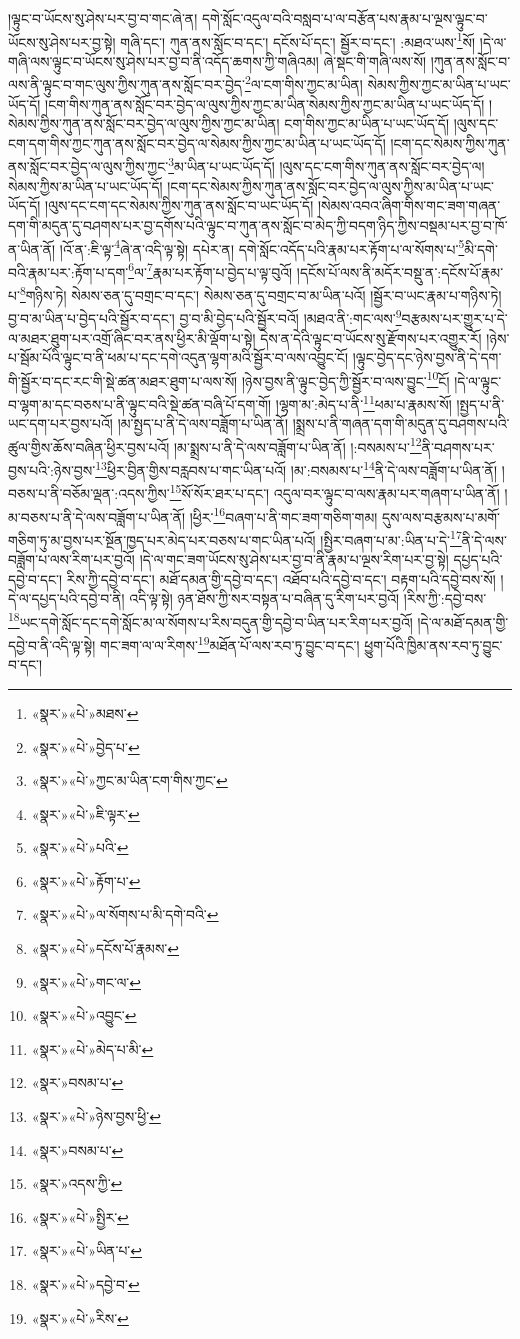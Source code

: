།ལྟུང་བ་ཡོངས་སུ་ཤེས་པར་བྱ་བ་གང་ཞེ་ན། དགེ་སློང་འདུལ་བའི་བསླབ་པ་ལ་བརྩོན་པས་རྣམ་པ་ལྔས་ལྟུང་བ་ཡོངས་སུ་ཤེས་པར་བྱ་སྟེ། གཞི་དང་། ཀུན་ནས་སློང་བ་དང་། དངོས་པོ་དང་། སྦྱོར་བ་དང་། :མཐའ་ཡས་\footnote{«སྣར་»«པེ་»མཐས་}སོ། །དེ་ལ་གཞི་ལས་ལྟུང་བ་ཡོངས་སུ་ཤེས་པར་བྱ་བ་ནི་འདོད་ཆགས་ཀྱི་གཞིའམ། ཞེ་སྡང་གི་གཞི་ལས་སོ། །ཀུན་ནས་སློང་བ་ལས་ནི་ལྟུང་བ་གང་ལུས་ཀྱིས་ཀུན་ནས་སློང་བར་བྱེད་\footnote{«སྣར་»«པེ་»བྱེད་པ་}ལ་ངག་གིས་ཀྱང་མ་ཡིན། སེམས་ཀྱིས་ཀྱང་མ་ཡིན་པ་ཡང་ཡོད་དོ། །ངག་གིས་ཀུན་ནས་སློང་བར་བྱེད་ལ་ལུས་ཀྱིས་ཀྱང་མ་ཡིན་སེམས་ཀྱིས་ཀྱང་མ་ཡིན་པ་ཡང་ཡོད་དོ། །སེམས་ཀྱིས་ཀུན་ནས་སློང་བར་བྱེད་ལ་ལུས་ཀྱིས་ཀྱང་མ་ཡིན། ངག་གིས་ཀྱང་མ་ཡིན་པ་ཡང་ཡོད་དོ། །ལུས་དང་ངག་དག་གིས་ཀྱང་ཀུན་ནས་སློང་བར་བྱེད་ལ་སེམས་ཀྱིས་ཀྱང་མ་ཡིན་པ་ཡང་ཡོད་དོ། །ངག་དང་སེམས་ཀྱིས་ཀུན་ནས་སློང་བར་བྱེད་ལ་ལུས་ཀྱིས་ཀྱང་\footnote{«སྣར་»«པེ་»ཀྱང་མ་ཡིན་ངག་གིས་ཀྱང་}མ་ཡིན་པ་ཡང་ཡོད་དོ། །ལུས་དང་ངག་གིས་ཀུན་ནས་སློང་བར་བྱེད་ལ། སེམས་ཀྱིས་མ་ཡིན་པ་ཡང་ཡོད་དོ། །ངག་དང་སེམས་ཀྱིས་ཀུན་ནས་སློང་བར་བྱེད་ལ་ལུས་ཀྱིས་མ་ཡིན་པ་ཡང་ཡོད་དོ། །ལུས་དང་ངག་དང་སེམས་ཀྱིས་ཀུན་ནས་སློང་བ་ཡང་ཡོད་དོ། །སེམས་འབའ་ཞིག་གིས་གང་ཟག་གཞན་དག་གི་མདུན་དུ་བཤགས་པར་བྱ་དགོས་པའི་ལྟུང་བ་ཀུན་ནས་སློང་བ་མེད་ཀྱི་བདག་ཉིད་ཀྱིས་བསྡམ་པར་བྱ་བ་ཁོ་ན་ཡིན་ནོ། །འོ་ན་:ཇི་ལྟ་\footnote{«སྣར་»«པེ་»ཇི་ལྟར་}ཞེ་ན་འདི་ལྟ་སྟེ། དཔེར་ན། དགེ་སློང་འདོད་པའི་རྣམ་པར་རྟོག་པ་ལ་སོགས་པ་\footnote{«སྣར་»«པེ་»པའི་}མི་དགེ་བའི་རྣམ་པར་:རྟོག་པ་དག་\footnote{«སྣར་»«པེ་»རྟོག་པ་}ལ་\footnote{«སྣར་»«པེ་»ལ་སོགས་པ་མི་དགེ་བའི་}རྣམ་པར་རྟོག་པ་བྱེད་པ་ལྟ་བུའོ། །དངོས་པོ་ལས་ནི་མདོར་བསྡུ་ན་:དངོས་པོ་རྣམ་པ་\footnote{«སྣར་»«པེ་»དངོས་པོ་རྣམས་}གཉིས་ཏེ། སེམས་ཅན་དུ་བགྲང་བ་དང་། སེམས་ཅན་དུ་བགྲང་བ་མ་ཡིན་པའོ། །སྦྱོར་བ་ཡང་རྣམ་པ་གཉིས་ཏེ། བྱ་བ་མ་ཡིན་པ་བྱེད་པའི་སྦྱོར་བ་དང་། བྱ་བ་མི་བྱེད་པའི་སྦྱོར་བའོ། །མཐའ་ནི་:གང་ལས་\footnote{«སྣར་»«པེ་»གང་ལ་}བརྩམས་པར་གྱུར་པ་དེ་ལ་མཐར་ཐུག་པར་འགྲོ་ཞིང་བར་ནས་ཕྱིར་མི་ལྡོག་པ་སྟེ། དེས་ན་དེའི་ལྟུང་བ་ཡོངས་སུ་རྫོགས་པར་འགྱུར་རོ། །ཉེས་པ་སྦོམ་པོའི་ལྟུང་བ་ནི་ཕམ་པ་དང་དགེ་འདུན་ལྷག་མའི་སྦྱོར་བ་ལས་འབྱུང་ངོ། །ལྟུང་བྱེད་དང་ཉེས་བྱས་ནི་དེ་དག་གི་སྦྱོར་བ་དང་རང་གི་སྡེ་ཚན་མཐར་ཐུག་པ་ལས་སོ། །ཉེས་བྱས་ནི་ལྟུང་བྱེད་ཀྱི་སྦྱོར་བ་ལས་བྱུང་\footnote{«སྣར་»«པེ་»འབྱུང་}ངོ། །དེ་ལ་ལྟུང་བ་ལྷག་མ་དང་བཅས་པ་ནི་ལྟུང་བའི་སྡེ་ཚན་བཞི་པོ་དག་གོ། །ལྷག་མ་:མེད་པ་ནི་\footnote{«སྣར་»«པེ་»མེད་པ་མི་}ཕམ་པ་རྣམས་སོ། །སྤྱད་པ་ནི་ཡང་དག་པར་བྱས་པའོ། །མ་སྤྱད་པ་ནི་དེ་ལས་བཟློག་པ་ཡིན་ནོ། །སྨྲས་པ་ནི་གཞན་དག་གི་མདུན་དུ་བཤགས་པའི་ཚུལ་གྱིས་ཆོས་བཞིན་ཕྱིར་བྱས་པའོ། །མ་སྨྲས་པ་ནི་དེ་ལས་བཟློག་པ་ཡིན་ནོ། །:བསམས་པ་\footnote{«སྣར་»བསམ་པ་}ནི་བཤགས་པར་བྱས་པའི་:ཉེས་བྱས་\footnote{«སྣར་»«པེ་»ཉེས་བྱས་ཕྱི་}ཕྱིར་བྱིན་གྱིས་བརླབས་པ་གང་ཡིན་པའོ། །མ་:བསམས་པ་\footnote{«སྣར་»བསམ་པ་}ནི་དེ་ལས་བཟློག་པ་ཡིན་ནོ། །བཅས་པ་ནི་བཅོམ་ལྡན་:འདས་ཀྱིས་\footnote{«སྣར་»འདས་ཀྱི་}སོ་སོར་ཐར་པ་དང་། འདུལ་བར་ལྟུང་བ་ལས་རྣམ་པར་གཞག་པ་ཡིན་ནོ། །མ་བཅས་པ་ནི་དེ་ལས་བཟློག་པ་ཡིན་ནོ། །ཕྱིར་\footnote{«སྣར་»«པེ་»སྤྱིར་}བཞག་པ་ནི་གང་ཟག་གཅིག་གམ། དུས་ལས་བརྩམས་པ་མགོ་གཅིག་ཏུ་མ་བྱས་པར་སྔོན་ཁྱད་པར་མེད་པར་བཅས་པ་གང་ཡིན་པའོ། །སྤྱིར་བཞག་པ་མ་:ཡིན་པ་དེ་\footnote{«སྣར་»«པེ་»ཡིན་པ་}ནི་དེ་ལས་བཟློག་པ་ལས་རིག་པར་བྱའོ། །དེ་ལ་གང་ཟག་ཡོངས་སུ་ཤེས་པར་བྱ་བ་ནི་རྣམ་པ་ལྔས་རིག་པར་བྱ་སྟེ། དཔྱད་པའི་དབྱེ་བ་དང་། རིས་ཀྱི་དབྱེ་བ་དང་། མཐོ་དམན་གྱི་དབྱེ་བ་དང་། འཐོབ་པའི་དབྱེ་བ་དང་། བརྟག་པའི་དབྱེ་བས་སོ། །དེ་ལ་དཔྱད་པའི་དབྱེ་བ་ནི། འདི་ལྟ་སྟེ། ཉན་ཐོས་ཀྱི་སར་བསྟན་པ་བཞིན་དུ་རིག་པར་བྱའོ། །རིས་ཀྱི་:དབྱེ་བས་\footnote{«སྣར་»«པེ་»དབྱེ་བ་}ཡང་དགེ་སློང་དང་དགེ་སློང་མ་ལ་སོགས་པ་རིས་བདུན་གྱི་དབྱེ་བ་ཡིན་པར་རིག་པར་བྱའོ། །དེ་ལ་མཐོ་དམན་གྱི་དབྱེ་བ་ནི་འདི་ལྟ་སྟེ། གང་ཟག་ལ་ལ་རིགས་\footnote{«སྣར་»«པེ་»རིས་}མཐོན་པོ་ལས་རབ་ཏུ་བྱུང་བ་དང་། ཕྱུག་པོའི་ཁྱིམ་ནས་རབ་ཏུ་བྱུང་བ་དང་། 